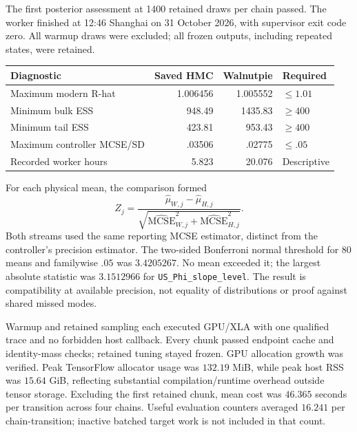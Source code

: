 The first posterior assessment at 1400 retained draws per chain passed.
The worker finished at 12:46 Shanghai on 31 October 2026, with supervisor
exit code zero. All warmup draws were excluded; all frozen outputs,
including repeated states, were retained.

\begin{center}\small
\begin{tabular}{lrrl}
\toprule
Diagnostic & Saved HMC & Walnutpie & Required\\
\midrule
Maximum modern R-hat & 1.006456 & 1.005552 & $\leq1.01$\\
Minimum bulk ESS & 948.49 & 1435.83 & $\geq400$\\
Minimum tail ESS & 423.81 & 953.43 & $\geq400$\\
Maximum controller MCSE/SD & .03506 & .02775 & $\leq.05$\\
Recorded worker hours & 5.823 & 20.076 & Descriptive\\
\bottomrule
\end{tabular}
\end{center}

For each physical mean, the comparison formed
\begin{equation}
 Z_j=\frac{\widehat\mu_{W,j}-\widehat\mu_{H,j}}
 {\sqrt{\widehat{\mathrm{MCSE}}_{W,j}^{2}+
             \widehat{\mathrm{MCSE}}_{H,j}^{2}}}.
 \label{eq:sw-mean-comparison}
\end{equation}
Both streams used the same reporting MCSE estimator, distinct from the
controller's precision estimator. The two-sided Bonferroni normal
threshold for 80 means and familywise $.05$ was $3.4205267$. No mean
exceeded it; the largest absolute statistic was $3.1512966$ for
\texttt{US\_Phi\_slope\_level}. The result is compatibility at available
precision, not equality of distributions or proof against shared missed modes.

Warmup and retained sampling each executed GPU/XLA with one qualified trace
and no forbidden host callback. Every chunk passed endpoint cache and
identity-mass checks; retained tuning stayed frozen. GPU allocation growth
was verified. Peak TensorFlow allocator usage was $132.19$ MiB, while
peak host RSS was $15.64$ GiB, reflecting substantial compilation/runtime
overhead outside tensor storage. Excluding the first retained chunk, mean
cost was $46.365$ seconds per transition across four chains. Useful
evaluation counters averaged $16.241$ per chain-transition; inactive
batched target work is not included in that count.


